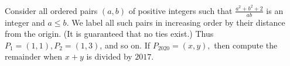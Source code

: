 Consider all ordered pairs $(a, b)$ of positive integers such that $\frac{a^2 + b^2 + 2}{ab}$ is an integer and $a\le b$. We label all such pairs in increasing order by their distance from the origin. (It is guaranteed that no ties exist.) Thus $P_1 = (1, 1), P_2 = (1, 3)$, and so on. If $P_{2020} = (x, y),$ then compute the remainder when $x + y$ is divided by $2017$.
